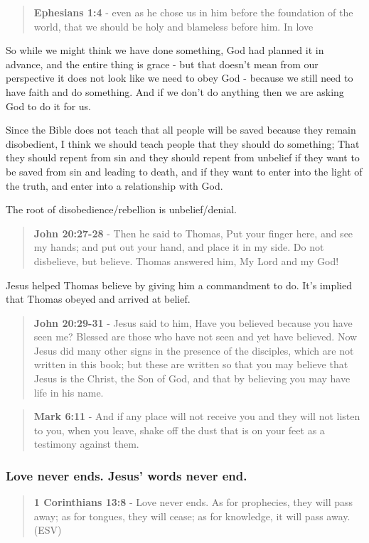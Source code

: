 \documentclass[11pt]{article}
\begin{document}
\begin{quote}
\textbf{Ephesians 1:4} - even as he chose us in him before the foundation of the world, that we should be holy and blameless before him. In love
\end{quote}

So while we might think we have done something, God had planned it in advance, and the entire thing is grace - but that doesn't mean from our perspective it does not look like we need to obey God - because we still need to have faith and do something. And if we don't do anything then we are asking God to do it for us.

Since the Bible does not teach that all people will be saved because they remain disobedient, I think we should teach people that they should do something; That they should repent from sin and they should repent from unbelief if they want to be saved from sin and leading to death, and if they want to enter into the light of the truth, and enter into a relationship with God.

The root of disobedience/rebellion is unbelief/denial.

\begin{quote}
\textbf{John 20:27-28} - Then he said to Thomas, Put your finger here, and see my hands; and put out your hand, and place it in my side. Do not disbelieve, but believe. Thomas answered him, My Lord and my God!
\end{quote}

Jesus helped Thomas believe by giving him a commandment to do. It's implied that Thomas obeyed and arrived at belief.

\begin{quote}
\textbf{John 20:29-31} - Jesus said to him, Have you believed because you have seen me? Blessed are those who have not seen and yet have believed.  Now Jesus did many other signs in the presence of the disciples, which are not written in this book; but these are written so that you may believe that Jesus is the Christ, the Son of God, and that by believing you may have life in his name.
\end{quote}

\begin{quote}
\textbf{Mark 6:11} - And if any place will not receive you and they will not listen to you, when you leave, shake off the dust that is on your feet as a testimony against them.
\end{quote}

\subsubsection{Love never ends. Jesus' words never end.}
\label{sec:org87bc481}
\begin{quote}
\textbf{1 Corinthians 13:8} -  Love never ends.  As for prophecies, they will pass away; as for tongues, they will cease; as for knowledge, it will pass away. (ESV)
\end{quote}
\end{document}
